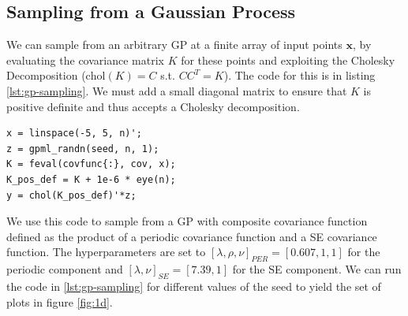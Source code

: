 \documentclass[]{article}
\begin{document}
\subsection{Sampling from a Gaussian Process}

We can sample from an arbitrary GP at a finite array of input points $\mathbf{x}$, by evaluating the covariance matrix $K$ for these points and exploiting the Cholesky Decomposition ($\text{chol}(K) = C$ s.t. $C C^T = K$). The code for this is in listing \ref{lst:gp-sampling}. We must add a small diagonal matrix to ensure that $K$ is positive definite and thus accepts a Cholesky decomposition.

\begin{lstlisting}[frame=single, caption={GP sampling}, label={lst:gp-sampling}]
x = linspace(-5, 5, n)';
z = gpml_randn(seed, n, 1);
K = feval(covfunc{:}, cov, x);
K_pos_def = K + 1e-6 * eye(n);
y = chol(K_pos_def)'*z;
\end{lstlisting}

We use this code to sample from a GP with composite covariance function defined as the product of a periodic covariance function and a SE covariance function. The hyperparameters are set to $[\lambda, \rho, \nu]_{PER} = [0.607, 1, 1]$ for the periodic component and $[\lambda, \nu]_{SE} = [7.39, 1]$ for the SE component. We can run the code in \ref{lst:gp-sampling} for different values of the seed to yield the set of plots in figure \ref{fig:1d}.
\end{document}
